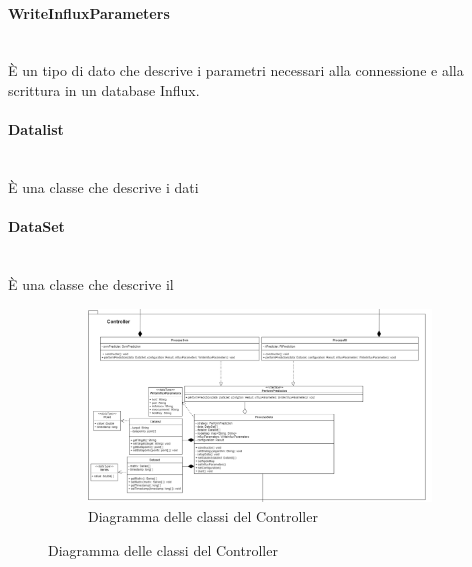 \paragraph*{WriteInfluxParameters} \mbox{}\\ [1mm]
È un tipo di dato che descrive i parametri necessari alla connessione e alla scrittura in un database Influx.
\paragraph*{Datalist} \mbox{}\\ [1mm]
È una classe che descrive i dati 
\paragraph*{DataSet} \mbox{}\\ [1mm]
È una classe che descrive il 
\mbox{}
\begin{landscape}
	\begin{figure}
		\begin{figure} [H]
			\includegraphics[width=\linewidth]{./img/Diagrammi/controller-plug-in.png}
			\caption{Diagramma delle classi del Controller}
		\end{figure}
	\end{figure}
\end{landscape}
